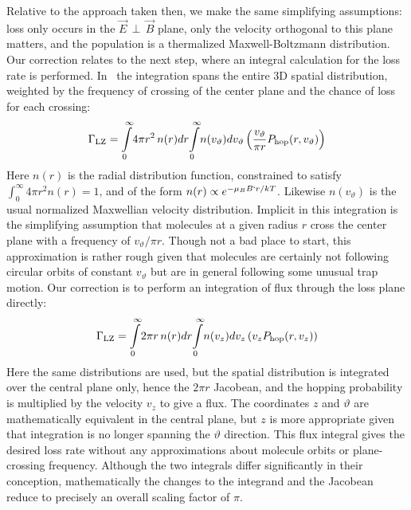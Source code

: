 \documentclass[%
 reprint,
 amsmath,amssymb,
 aps,
pra,
]{revtex4-1}
\newcommand{\epb}{{$\vec{E}\,{\perp}\,\vec{B}$}}
\begin{document}
Relative to the approach taken then, we make the same simplifying assumptions: loss only occurs in the \epb{} plane, only the velocity orthogonal to this plane matters, and the population is a thermalized Maxwell-Boltzmann distribution.
Our correction relates to the next step, where an integral calculation for the loss rate is performed.
In~\cite{Stuhl2013} the integration spans the entire 3D spatial distribution, weighted by the frequency of crossing of the center plane and the chance of loss for each crossing:
\begin{equation}
\Gamma_\text{LZ}=\int\displaylimits_0^\infty\!4\pi r^2\,n(r)dr\!\int\displaylimits_0^\infty \!n(v_\vartheta)dv_\vartheta\left( \frac{v_\vartheta}{\pi r} P_\text{hop}(r,v_\vartheta)\right)
\end{equation}
Here $n(r)$ is the radial distribution function, constrained to satisfy $\int_0^\infty 4\pi r^2n(r)=1$, and of the form $n(r)\propto e^{-\mu_BB`r/kT}$. 
Likewise $n(v_\vartheta)$ is the usual normalized Maxwellian velocity distribution. 
Implicit in this integration is the simplifying assumption that molecules at a given radius $r$ cross the center plane with a frequency of $v_\vartheta/\pi r$.
Though not a bad place to start, this approximation is rather rough given that molecules are certainly not following circular orbits of constant $v_\vartheta$ but are in general following some unusual trap motion.
Our correction is to perform an integration of flux through the loss plane directly:
\begin{equation}
\Gamma_\text{LZ}=\int\displaylimits_0^\infty\!2\pi r \,n(r)dr\!\int\displaylimits_0^\infty\! n(v_z)dv_z\left(v_z P_\text{hop}(r,v_z)\right)
\end{equation}
Here the same distributions are used, but the spatial distribution is integrated over the central plane only, hence the $2\pi r$ Jacobean, and the hopping probability is multiplied by the velocity $v_z$ to give a flux.
The coordinates $z$ and $\vartheta$ are mathematically equivalent in the central plane, but $z$ is more appropriate given that integration is no longer spanning the $\vartheta$ direction.
This flux integral gives the desired loss rate without any approximations about molecule orbits or plane-crossing frequency.
Although the two integrals differ significantly in their conception, mathematically the changes to the integrand and the Jacobean reduce to precisely an overall scaling factor of $\pi$.
\end{document}
